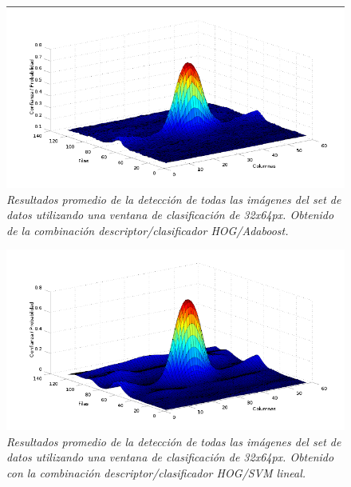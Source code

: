 \begin{figure}[htc]
  \centering
  \includegraphics[scale=.6]{images/mean/boost/32}
  \caption{\em  Resultados promedio de la detección de todas las imágenes del set de datos utilizando una ventana de clasificación de 32x64px. Obtenido de la combinación descriptor/clasificador HOG/Adaboost.}  
  \label{fig:gp1}
\end{figure}

\begin{figure}[htc]
  \centering
  \includegraphics[scale=.6]{images/mean/svm/32}
  \caption{\em  Resultados promedio de la detección de todas las imágenes del set de datos utilizando una ventana de clasificación de 32x64px. Obtenido con la combinación descriptor/clasificador HOG/SVM lineal.}  
  \label{fig:gp2}
\end{figure}

